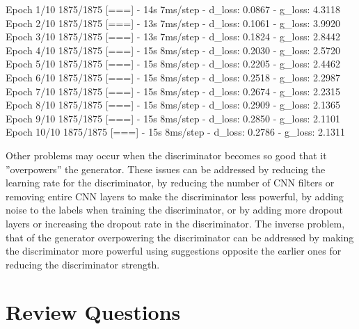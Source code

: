 \begin{withcode}
\begin{textcode}
Epoch 1/10
1875/1875 [===] - 14s 7ms/step - d_loss: 0.0867 - g_loss: 4.3118
Epoch 2/10
1875/1875 [===] - 13s 7ms/step - d_loss: 0.1061 - g_loss: 3.9920
Epoch 3/10
1875/1875 [===] - 13s 7ms/step - d_loss: 0.1824 - g_loss: 2.8442
Epoch 4/10
1875/1875 [===] - 15s 8ms/step - d_loss: 0.2030 - g_loss: 2.5720
Epoch 5/10
1875/1875 [===] - 15s 8ms/step - d_loss: 0.2205 - g_loss: 2.4462
Epoch 6/10
1875/1875 [===] - 15s 8ms/step - d_loss: 0.2518 - g_loss: 2.2987
Epoch 7/10
1875/1875 [===] - 15s 8ms/step - d_loss: 0.2674 - g_loss: 2.2315
Epoch 8/10
1875/1875 [===] - 15s 8ms/step - d_loss: 0.2909 - g_loss: 2.1365
Epoch 9/10
1875/1875 [===] - 15s 8ms/step - d_loss: 0.2850 - g_loss: 2.1101
Epoch 10/10
1875/1875 [===] - 15s 8ms/step - d_loss: 0.2786 - g_loss: 2.1311
\end{textcode}

Other problems may occur when the discriminator becomes so good that it ''overpowers'' the generator. These issues can be addressed by reducing the learning rate for the discriminator, by reducing the number of CNN filters or removing entire CNN layers to make the discriminator less powerful, by adding noise to the labels when training the discriminator, or by adding more dropout layers or increasing the dropout rate in the discriminator. The inverse problem, that of the generator overpowering the discriminator can be addressed by making the discriminator more powerful using suggestions opposite the earlier ones for reducing the discriminator strength.
\end{withcode}

\FloatBarrier

\section{Review Questions}
